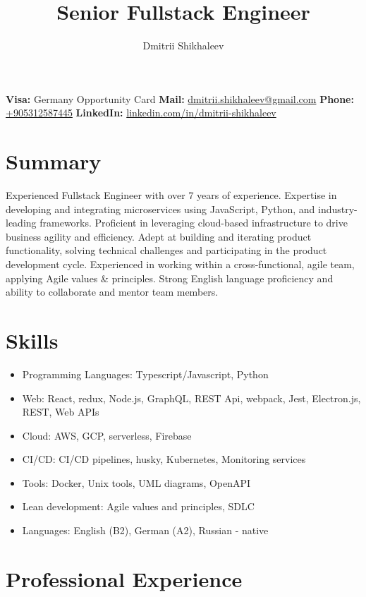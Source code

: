 \documentclass[11pt, a4paper]{article}
\author{Dmitrii Shikhaleev}
\title{Senior Fullstack Engineer}
\makeatletter
\newcommand{\thecontacts}{
    {\bfseries{Visa:}} Germany Opportunity Card \hfill
    \hfill\hspace{0.2em} \break \hspace{0.2em}
    {\bfseries{Mail:}} \href{mailto:dmitrii.shikhaleev@gmail.com}{dmitrii.shikhaleev@gmail.com}
    \hfill\hspace{0.2em} \break \hspace{0.2em} 
    {\bfseries{Phone:}} \href{tel:+905312587445}{+905312587445}
    \hfill\hspace{0.2em} \break \hspace{0.2em}
    {\bfseries{LinkedIn:}} \href{https://www.linkedin.com/in/dmitrii-shikhaleev/}{linkedin.com/in/dmitrii-shikhaleev}
}
\renewcommand{\maketitle}{
  \noindent
  \begin{minipage}[t]{0.6\textwidth}
    {\Huge\color{ColorBlack}\textbf{\theauthor}} \hfill\vspace{0.6em}\break
    {\Large{\thetitle}} \hfill\vspace{0.8em}\break
    \thecontacts \hfill\vspace{0.4em}\break

  \end{minipage}
  \hfill
}
\makeatother
\begin{document}
\begin{spacing}{1.1}
\maketitle

\section{Summary}

Experienced Fullstack Engineer with over 7 years of experience. Expertise in developing and integrating microservices using JavaScript, Python, and industry-leading frameworks. Proficient in leveraging cloud-based infrastructure to drive business agility and efficiency. Adept at building and iterating product functionality, solving technical challenges and participating in the product development cycle. Experienced in working within a cross‐functional, agile team, applying Agile values \& principles. Strong English language proficiency and ability to collaborate and mentor team members.

\section{Skills}
\begin{itemize}[leftmargin=20pt,label=\strut\hspace{0.4em}\textcolor{ColorBlue}{\large\rmfamily\textbullet}, itemsep=-8pt]
  \item Programming Languages: Typescript/Javascript, Python
  \item Web: React, redux, Node.js, GraphQL, REST Api, webpack, Jest, Electron.js, REST, Web APIs
  \item Cloud: AWS, GCP, serverless, Firebase
  \item CI/CD: CI/CD pipelines, husky, Kubernetes, Monitoring services
  \item Tools: Docker, Unix tools, UML diagrams, OpenAPI
  \item Lean development: Agile values and principles, SDLC
  \item Languages: English (B2), German (A2), Russian - native
\end{itemize}

\section{Professional Experience}


\end{spacing}
\end{document}
